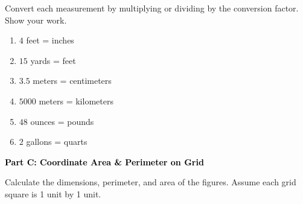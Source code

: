 \documentclass[12pt, letterpaper, fleqn]{article}
\newcommand{\blank}{\underline{\hspace{2.2cm}}}
\begin{document}
\vspace{3mm}

\noindent
Convert each measurement by multiplying or dividing by the conversion factor. Show your work.

\vspace{5mm}

\begin{enumerate}[itemsep=2.0cm, leftmargin=0.6cm]
\item $4$ feet = \blank inches
\vspace{0.5cm}

\item $15$ yards = \blank feet
\vspace{0.5cm}

\item $3.5$ meters = \blank centimeters
\vspace{0.5cm}

\item $5000$ meters = \blank kilometers
\vspace{0.5cm}

\item $48$ ounces = \blank pounds
\vspace{0.5cm}

\item $2$ gallons = \blank quarts
\end{enumerate}

\newpage

\begin{tcolorbox}[colback=black!10]
    \large\textcolor{black}{\textbf{Part C: Coordinate Area \& Perimeter on Grid}}
\end{tcolorbox}

\vspace{3mm}

\noindent
Calculate the dimensions, perimeter, and area of the figures. Assume each grid square is 1 unit by 1 unit.

\vspace{5mm}
\end{document}
